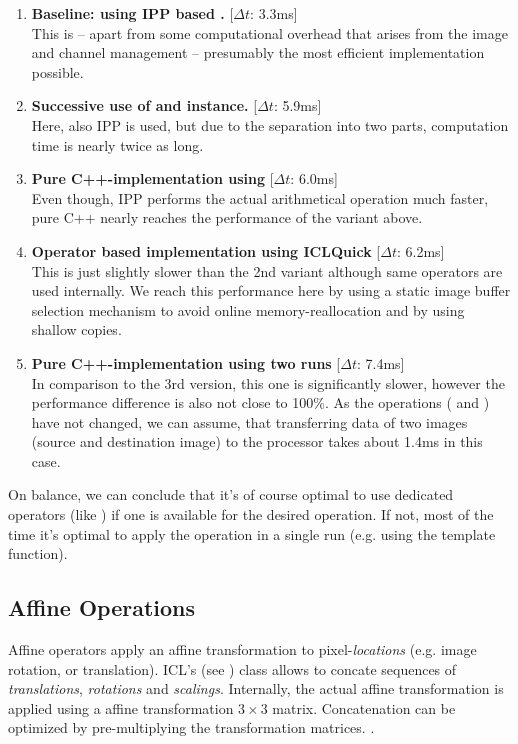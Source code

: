 \begin{enumerate}
\item \textbf{Baseline: using IPP based .} [$\Delta t$: 3.3ms]\\
This is -- apart from some computational overhead that arises from the image and channel management -- presumably the most efficient implementation possible. 
\item \textbf{Successive use of  and  instance.} [$\Delta t$: 5.9ms]\\
Here, also IPP is used, but due to the separation into two parts, computation time is nearly twice as long. 
\item \textbf{Pure C++-implementation using } [$\Delta t$: 6.0ms]\\
Even though, IPP performs the actual arithmetical operation much faster, pure C++ nearly reaches the performance of the variant above. 
\item \textbf{Operator based implementation using ICLQuick} [$\Delta t$: 6.2ms]\\
This is just slightly slower than the 2nd variant although same operators are used internally. We reach this performance here by using a static image buffer selection mechanism to avoid online memory-reallocation and by using shallow copies.
\item \textbf{Pure C++-implementation using two runs} [$\Delta t$: 7.4ms]\\
In comparison to the 3rd version, this one is significantly slower, however the performance difference is also not close to 100\%. As the operations (\icode{-} and ) have not changed, we can assume, that transferring data of two images (source and destination image) to the processor takes about 1.4ms in this case. 
\end{enumerate}

On balance, we can conclude that it's of course optimal to use dedicated operators (like ) if one is available for the desired operation. If not, most of the time it's optimal to apply the operation in a single run (e.g. using the  template function).

\subsection{Affine Operations\label{subsec:affine-ops}}
Affine operators apply an affine transformation to pixel-\emph{locations} (e.g. image rotation, or translation). ICL's  (see ) class allows to concate sequences of \emph{translations}, \emph{rotations} and \emph{scalings}. Internally, the actual affine transformation is applied using a affine transformation $3 \times{}3$ matrix. Concatenation can be optimized by pre-multiplying the transformation matrices. .

